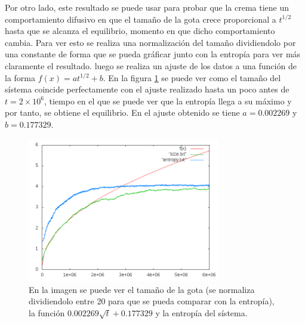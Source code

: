 \documentclass[12pt,twocolumn]{article}
\begin{document}
Por otro lado, este resultado se puede usar para probar que la crema tiene un comportamiento difusivo en que el tamaño de la gota crece proporcional a $t^{1/2}$ hasta que se alcanza el equilibrio, momento en que dicho comportamiento cambia. Para ver esto se realiza una normalización del tamaño dividiendolo por una constante de forma que se pueda gráficar junto con la entropía para ver más claramente el resultado. luego se realiza un ajuste de los datos a una función de la forma $f(x)= at^{1/2} + b$. En la figura \ref{fig:size} se puede ver como el tamaño del sístema coincide perfectamente con el ajuste realizado hasta un poco antes de $t= 2\times 10^6$, tiempo en el que se puede ver que la entropía llega a su máximo y por tanto, se obtiene el equilibrio. En el ajuste obtenido se tiene $a=  0.002269$ y $b= 0.177329$.

\begin{figure}
    \centering
    \includegraphics[width=0.75\textwidth]{figs/size.png}
    \caption{En la imagen se puede ver el tamaño de la gota (se normaliza dividiendolo entre 20 para que se pueda comparar con la entropía), la función $0.002269 \sqrt{t} + 0.177329$ y la entropía del sístema.}
    \label{fig:size}
\end{figure}
\end{document}

